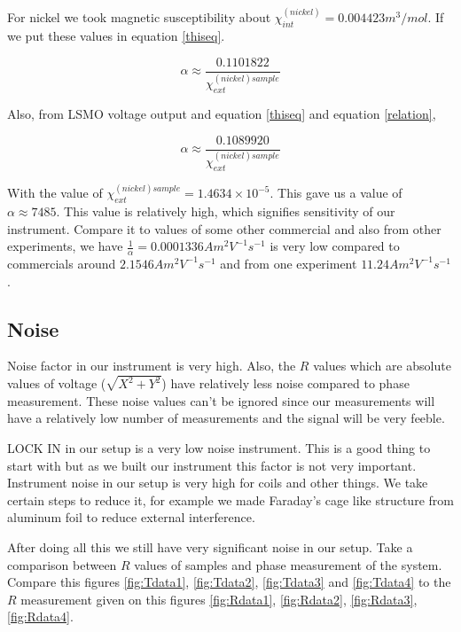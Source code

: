 For nickel we took magnetic susceptibility about $\chi_{int}^{(nickel)}=0.004423 m^3/mol$\cite{PhysRev.17.678}. If we put these values in equation \ref{thiseq}.



\begin{equation*}
\alpha \approx \frac{0.1101822}{\chi_{ext}^{(nickel)sample}}
\end{equation*}


Also, from LSMO voltage output and equation \ref{thiseq} and equation \ref{relation}, 


\begin{equation*}
\alpha \approx \frac{0.1089920}{\chi_{ext}^{(nickel)sample}}
\end{equation*}

With the value of $\chi_{ext}^{(nickel)sample} = 1.4634 \times 10^{-5}$. This gave us a value of $\alpha \approx 7485$. This value is relatively high, which signifies sensitivity of our instrument. Compare it to values of some other commercial and also from other experiments, we have $\frac{1}{\alpha}= 0.0001336 Am^2V^{-1}s^{-1}$ is very low compared to commercials around $2.1546Am^2V^{-1}s^{-1}$ and from one experiment $11.24 Am^2V^{-1}s^{-1}$\cite{cambr}.


\subsection{Noise}


Noise factor in our instrument is very high. Also, the $R$ values which are absolute values of voltage ($\sqrt{X^2+Y^2}$) have relatively less noise compared to phase measurement. These noise values can’t be ignored since our measurements will have a relatively low number of measurements and the signal will be very feeble.



LOCK IN in our setup is a very low noise instrument. This is a good thing to start with but as we built our instrument this factor is not very important. Instrument noise in our setup is very high for coils and other things. We take certain steps to reduce it, for example we made Faraday's cage like structure from aluminum foil to reduce external interference. 




After doing all this we still have very significant noise in our setup. Take a comparison between $R$ values of samples and phase measurement of the system. Compare this figures \ref{fig:Tdata1}, \ref{fig:Tdata2}, \ref{fig:Tdata3} and  \ref{fig:Tdata4} to the $R$ measurement given on this figures \ref{fig:Rdata1}, \ref{fig:Rdata2}, \ref{fig:Rdata3}, \ref{fig:Rdata4}.


